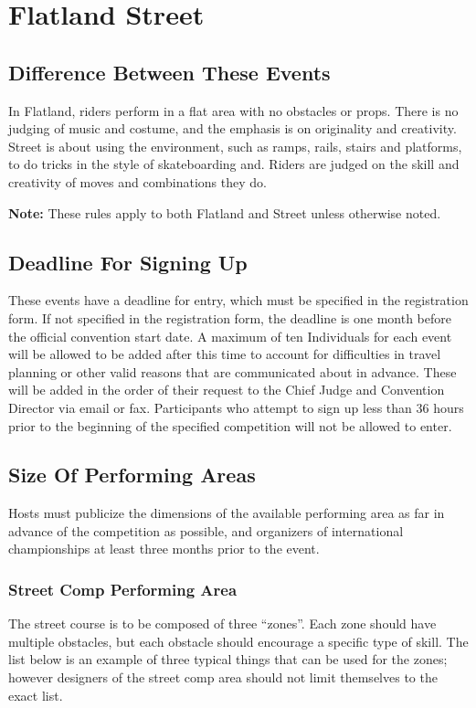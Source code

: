 \chapter{Flatland Street \label{chap:flat-street}}

\section{Difference Between These Events}
In Flatland, riders perform in a flat area with no obstacles or props.
There is no judging of music and costume, and the emphasis is on originality and creativity.
Street is about using the environment, such as ramps, rails, stairs and platforms, to do tricks in the style of skateboarding and.
Riders are judged on the skill and creativity of moves and combinations they do.

\textbf{Note:} These rules apply to both Flatland and Street unless otherwise noted.

\section{Deadline For Signing Up}
These events have a deadline for entry, which must be specified in the registration form.
If not specified in the registration form, the deadline is one month before the official convention start date.
A maximum of ten Individuals for each event will be allowed to be added after this time to account for difficulties in travel planning or other valid reasons that are communicated about in advance.
These will be added in the order of their request to the Chief Judge and Convention Director via email or fax.
Participants who attempt to sign up less than 36 hours prior to the beginning of the specified competition will not be allowed to enter.

\section{Size Of Performing Areas}
Hosts must publicize the dimensions of the available performing area as far in advance of the competition as possible, and organizers of international championships at least three months prior to the event.

\subsection{Street Comp Performing Area \label{subsec:flat-street_size-of-performing-area_street-comp}}
The street course is to be composed of three ``zones''.
Each zone should have multiple obstacles, but each obstacle should encourage a specific type of skill.
The list below is an example of three typical things that can be used for the zones; however designers of the street comp area should not limit themselves to the exact list.

